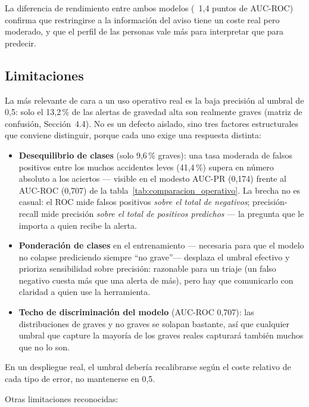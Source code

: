 \documentclass[11pt,a4paper]{article}
\begin{document}
La diferencia de rendimiento entre ambos modelos (~1,4 puntos de AUC-ROC) confirma que restringirse a la información del aviso tiene un coste real pero moderado, y que el perfil de las personas vale más para interpretar que para predecir.

\subsection{Limitaciones}

La más relevante de cara a un uso operativo real es la baja precisión al umbral de 0,5: solo el 13,2\,\% de las alertas de gravedad alta son realmente graves (matriz de confusión, Sección~4.4). No es un defecto aislado, sino tres factores estructurales que conviene distinguir, porque cada uno exige una respuesta distinta:

\begin{itemize}[nosep]
\item \textbf{Desequilibrio de clases} (solo 9,6\,\% graves): una tasa moderada de falsos positivos entre los muchos accidentes leves (41,4\,\%) supera en número absoluto a los aciertos --- visible en el modesto AUC-PR (0,174) frente al AUC-ROC (0,707) de la tabla~\ref{tab:comparacion_operativo}. La brecha no es casual: el ROC mide falsos positivos \emph{sobre el total de negativos}; precisión-recall mide precisión \emph{sobre el total de positivos predichos} --- la pregunta que le importa a quien recibe la alerta.
\item \textbf{Ponderación de clases} en el entrenamiento --- necesaria para que el modelo no colapse prediciendo siempre ``no grave''--- desplaza el umbral efectivo y prioriza sensibilidad sobre precisión: razonable para un triaje (un falso negativo cuesta más que una alerta de más), pero hay que comunicarlo con claridad a quien use la herramienta.
\item \textbf{Techo de discriminación del modelo} (AUC-ROC 0,707): las distribuciones de graves y no graves se solapan bastante, así que cualquier umbral que capture la mayoría de los graves reales capturará también muchos que no lo son.
\end{itemize}

En un despliegue real, el umbral debería recalibrarse según el coste relativo de cada tipo de error, no mantenerse en 0,5.

Otras limitaciones reconocidas:
\end{document}
